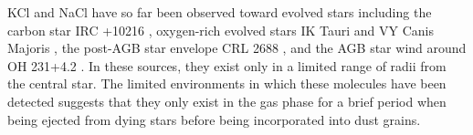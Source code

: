 \documentclass[twocolumn]{aastex62}
\newcommand{\sourcei}{SrcI\xspace}
\newcommand{\bam}[1]{\textcolor{green!65!black}{\textbf{[BAM: #1]}}}
\newcommand{\rlp}[1]{\textcolor{blue!65!black}{\textbf{[RLP: #1]}}}
\newcommand{\ag}[1]{\textcolor{red!65!black}{\textbf{[AG: #1]}}}
\begin{document}
KCl and NaCl have so far been observed toward evolved stars including the carbon star IRC
+10216 \citep{Cernicharo1987a}, oxygen-rich evolved stars IK Tauri and VY Canis
Majoris \citep{Milam2007a}, the post-AGB star envelope CRL 2688
\citep{Highberger2003a}, and the AGB star wind around OH 231+4.2
\citep{Sanchez-Contreras2018a}.  In these sources, they exist only in a limited
range of radii from the central star.  The limited environments in which these molecules have been
detected suggests that they only exist in the gas phase for a brief period when
being ejected from dying stars before being incorporated into dust grains.




\end{document}
